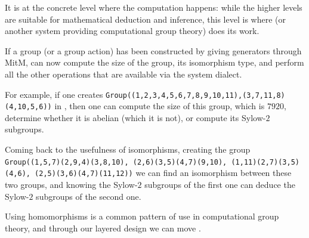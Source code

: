 It is at the concrete level where the computation happens: while the higher levels
are suitable for mathematical deduction and inference, this level is where \GAP
(or another system providing computational group theory) does its work.

If a group (or a group action) has been constructed by giving generators
through MitM, \GAP can now compute the size of the group, its isomorphism type,
and perform all the other operations that are available via the \GAP system
dialect.

For example, if one creates \lstinline|Group((1,2,3,4,5,6,7,8,9,10,11),(3,7,11,8)(4,10,5,6))|
in \GAP, then one can compute the size of this group, which is $7920$, determine
whether it is abelian (which it is not), or compute its Sylow-$2$ subgroups.

Coming back to the usefulness of isomorphisms, creating the group
\lstinline|Group((1,5,7)(2,9,4)(3,8,10), (2,6)(3,5)(4,7)(9,10), (1,11)(2,7)(3,5)(4,6), (2,5)(3,6)(4,7)(11,12))|
we can find an isomorphism between these two groups, and knowing the Sylow-$2$
subgroups of the first one can deduce the Sylow-$2$ subgroups of the second one.

Using homomorphisms is a common pattern of use in computational group theory,
and through our layered design we can move  .







